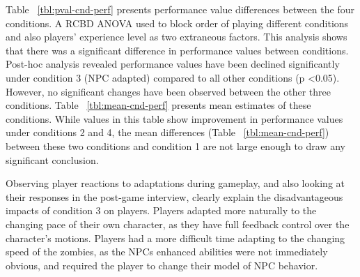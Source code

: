 \documentclass[conference]{IEEEtran}
\begin{document}
Table ~\ref{tbl:pval-cnd-perf} presents performance value differences between the four conditions. A RCBD ANOVA used to block order of playing different conditions and also players' experience level as two extraneous factors. This analysis shows that there was a significant difference in performance values between conditions. Post-hoc analysis revealed performance values have been declined significantly under condition 3 (NPC adapted) compared to all other conditions (p \textless 0.05). However, no significant changes have been observed between the other three conditions. Table ~\ref{tbl:mean-cnd-perf} presents mean estimates of these conditions. While values in this table show improvement in performance values under conditions 2 and 4, the mean differences (Table ~\ref{tbl:mean-cnd-perf}) between these two conditions and condition 1 are not large enough to draw any significant conclusion.

Observing player reactions to adaptations during gameplay, and also looking at their responses in the post-game interview, clearly explain the disadvantageous impacts of condition 3 on players. Players adapted more naturally to the changing pace of their own character, as they have full feedback control over the character's motions. Players had a more difficult time adapting to the changing speed of the zombies, as the NPCs enhanced abilities were not immediately obvious, and required the player to change their model of NPC behavior.
\end{document}
